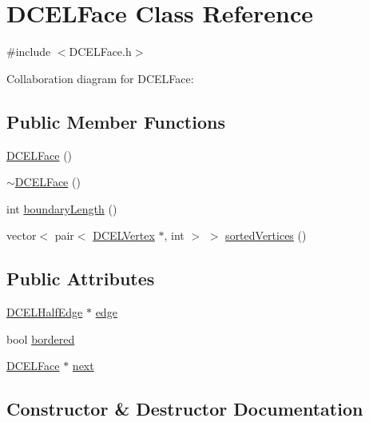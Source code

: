 \hypertarget{classDCELFace}{}\section{D\+C\+E\+L\+Face Class Reference}
\label{classDCELFace}


{\ttfamily \#include $<$D\+C\+E\+L\+Face.\+h$>$}



Collaboration diagram for D\+C\+E\+L\+Face\+:
\subsection*{Public Member Functions}
\begin{DoxyCompactItemize}
\item 
\hyperlink{classDCELFace_a0f96b42d02f10fecc92190875d78e63a}{D\+C\+E\+L\+Face} ()
\item 
\hyperlink{classDCELFace_a2baa90785e7476015218bba2c66c4e35}{$\sim$\+D\+C\+E\+L\+Face} ()
\item 
int \hyperlink{classDCELFace_adf080ea135357e2f5fb2f97d87d1a2fd}{boundary\+Length} ()
\item 
vector$<$ pair$<$ \hyperlink{classDCELVertex}{D\+C\+E\+L\+Vertex} $\ast$, int $>$ $>$ \hyperlink{classDCELFace_af00eb6cdb260a31b0a38ea86a92c4021}{sorted\+Vertices} ()
\end{DoxyCompactItemize}
\subsection*{Public Attributes}
\begin{DoxyCompactItemize}
\item 
\hyperlink{classDCELHalfEdge}{D\+C\+E\+L\+Half\+Edge} $\ast$ \hyperlink{classDCELFace_a1a6ec913fa7adbe1bfbad64b99ffe6c5}{edge}
\item 
bool \hyperlink{classDCELFace_a9b4085ea85f8aee290233e0e9ac1f605}{bordered}
\item 
\hyperlink{classDCELFace}{D\+C\+E\+L\+Face} $\ast$ \hyperlink{classDCELFace_a5fd804213fb2d96f900442da49ccb137}{next}
\end{DoxyCompactItemize}


\subsection{Constructor \& Destructor Documentation}
